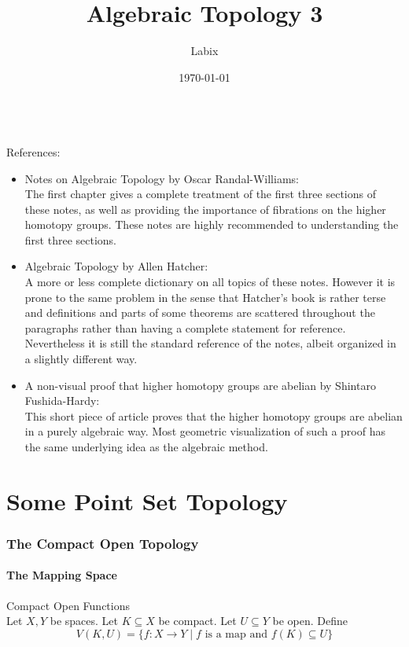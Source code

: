 \documentclass[a4paper]{article}
\title{Algebraic Topology 3}
\author{Labix}
\date{\today}
\begin{document}
\maketitle
\begin{abstract}
\end{abstract}
~\\
References: 
\begin{itemize}
\item Notes on Algebraic Topology by Oscar Randal-Williams: \\
The first chapter gives a complete treatment of the first three sections of these notes, as well as providing the importance of fibrations on the higher homotopy groups. These notes are highly recommended to understanding the first three sections. 

\item Algebraic Topology by Allen Hatcher: \\
A more or less complete dictionary on all topics of these notes. However it is prone to the same problem in the sense that Hatcher's book is rather terse and definitions and parts of some theorems are scattered throughout the paragraphs rather than having a complete statement for reference. Nevertheless it is still the standard reference of the notes, albeit organized in a slightly different way. 

\item A non-visual proof that higher homotopy groups are abelian by Shintaro Fushida-Hardy: \\
This short piece of article proves that the higher homotopy groups are abelian in a purely algebraic way. Most geometric visualization of such a proof has the same underlying idea as the algebraic method. 
\end{itemize}

\pagebreak
\tableofcontents

\pagebreak

\part{Some Point Set Topology}

\pagebreak
\section{The Compact Open Topology}
\subsection{The Mapping Space}
\begin{defn}{Compact Open Functions}{}\\
Let $X,Y$ be spaces. Let $K\subseteq X$ be compact. Let $U\subseteq Y$ be open. Define $$V(K,U)=\{f:X\to Y\;|\;f\text{ is a map and }f(K)\subseteq U\}$$
\end{defn}
\end{document}
